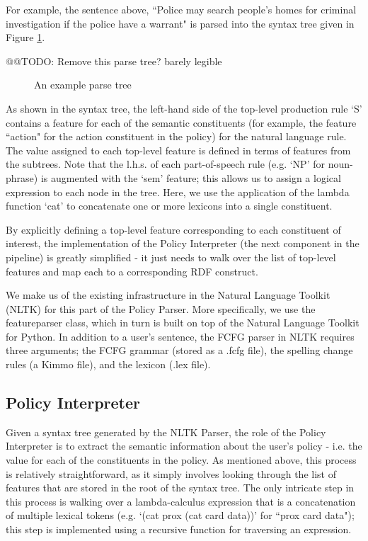 \documentclass{llncs}
\begin{document}
For example, the sentence above, ``Police may search people's homes for criminal investigation if the police have a warrant" is parsed into the syntax tree given in Figure \ref{fig-syntax-tree}.

@@TODO: Remove this parse tree? barely legible

\begin{figure}[!h]
  \centerline{}
  \caption{An example parse tree}
  \label{fig-syntax-tree}
\end{figure}

As shown in the syntax tree, the left-hand side of the top-level production rule `S' contains a feature for each of the semantic constituents (for example, the feature ``action" for the action constituent in the policy) for the natural language rule. The value assigned to each top-level feature is defined in terms of features from the subtrees. Note that the l.h.s. of each part-of-speech rule (e.g. `NP' for noun-phrase) is augmented with the `sem' feature; this allows us to assign a logical expression to each node in the tree. Here, we use the application of the lambda function `cat' to concatenate one or more lexicons into a single constituent.

By explicitly defining a top-level feature corresponding to each constituent of interest, the implementation of the Policy Interpreter (the next component in the pipeline) is greatly simplified - it just needs to walk over the list of top-level features and map each to a corresponding RDF construct.

We make us of the existing infrastructure in the Natural Language Toolkit (NLTK) \cite{nltk} for this part of the Policy Parser. More specifically, we use the featureparser class, which in turn is built on top of the Natural Language Toolkit for Python. In addition to a user's sentence, the FCFG parser in NLTK requires three arguments; the FCFG grammar (stored as a .fcfg file), the spelling change rules (a Kimmo file), and the lexicon (.lex file). 


\subsection{Policy Interpreter}

Given a syntax tree generated by the NLTK Parser, the role of the Policy Interpreter is to extract the semantic information about the user's policy - i.e. the value for each of the constituents in the policy. As mentioned above, this process is relatively straightforward, as it simply involves looking through the list of features that are stored in the root of the syntax tree. The only intricate step in this process is walking over a lambda-calculus expression that is a concatenation of multiple lexical tokens (e.g. `(cat prox (cat card data))' for ``prox card data"); this step is implemented using a recursive function for traversing an expression.
\end{document}
